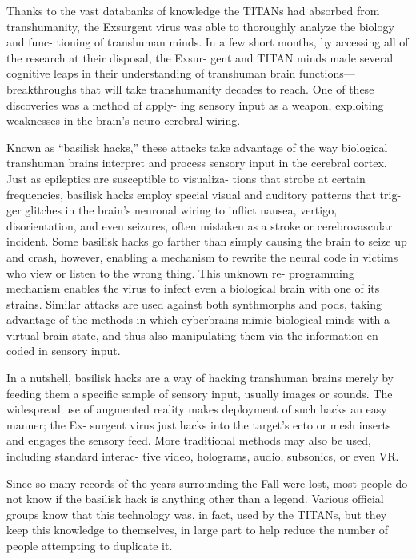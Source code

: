 Thanks to the vast databanks of knowledge the TITANs 
had absorbed from transhumanity, the Exsurgent virus 
was able to thoroughly analyze the biology and func-
tioning of transhuman minds. In a few short months, by 
accessing all of the research at their disposal, the Exsur-
gent and TITAN minds made several cognitive leaps in 
their understanding of transhuman brain functions—
breakthroughs that will take transhumanity decades to 
reach. One of these discoveries was a method of apply-
ing sensory input as a weapon, exploiting weaknesses 
in the brain's neuro-cerebral wiring.

Known as ``basilisk hacks,'' these attacks take 
advantage of the way biological transhuman brains 
interpret and process sensory input in the cerebral 
cortex. Just as epileptics are susceptible to visualiza-
tions that strobe at certain frequencies, basilisk hacks 
employ special visual and auditory patterns that trig-
ger glitches in the brain's neuronal wiring to inflict 
nausea, vertigo, disorientation, and even seizures, 
often mistaken as a stroke or cerebrovascular incident. 
Some basilisk hacks go farther than simply causing 
the brain to seize up and crash, however, enabling a 
mechanism to rewrite the neural code in victims who 
view or listen to the wrong thing. This unknown re-
programming mechanism enables the virus to infect 
even a biological brain with one of its strains. Similar 
attacks are used against both synthmorphs and pods, 
taking advantage of the methods in which cyberbrains 
mimic biological minds with a virtual brain state, and 
thus also manipulating them via the information en-
coded in sensory input.

In a nutshell, basilisk hacks are a way of hacking 
transhuman brains merely by feeding them a specific 
sample of sensory input, usually images or sounds. 
The widespread use of augmented reality makes 
deployment of such hacks an easy manner; the Ex-
surgent virus just hacks into the target's ecto or mesh 
inserts and engages the sensory feed. More traditional 
methods may also be used, including standard interac-
tive video, holograms, audio, subsonics, or even VR.

Since so many records of the years surrounding 
the Fall were lost, most people do not know if the 
basilisk hack is anything other than a legend. Various 
official groups know that this technology was, in fact, 
used by the TITANs, but they keep this knowledge to 
themselves, in large part to help reduce the number of 
people attempting to duplicate it. 

